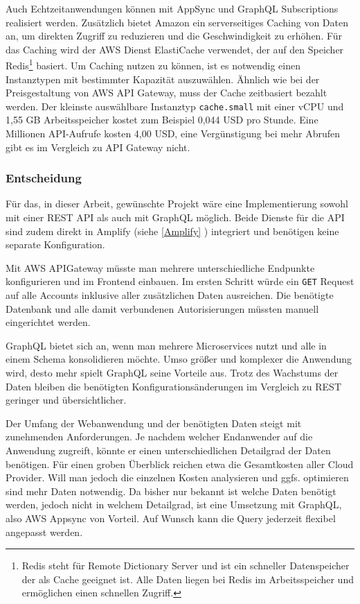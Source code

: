 Auch Echtzeitanwendungen können mit AppSync und GraphQL Subscriptions realisiert werden.
Zusätzlich bietet Amazon ein serverseitiges Caching von Daten an, um direkten Zugriff zu reduzieren und die Geschwindigkeit zu erhöhen.
Für das Caching wird der AWS Dienst ElastiCache verwendet, der auf den Speicher Redis\footnote{Redis steht für Remote Dictionary Server und ist ein schneller Datenspeicher der als Cache geeignet ist. Alle Daten liegen bei Redis im Arbeitsspeicher und ermöglichen einen schnellen Zugriff.} basiert.
Um Caching nutzen zu können, ist es notwendig einen Instanztypen mit bestimmter Kapazität auszuwählen.
Ähnlich wie bei der Preisgestaltung von AWS API Gateway, muss der Cache zeitbasiert bezahlt werden.
Der kleinste auswählbare Instanztyp \verb+cache.small+ mit einer vCPU und 1,55 GB Arbeitsspeicher kostet zum Beispiel 0,044 USD pro Stunde.
Eine Millionen API-Aufrufe kosten 4,00 USD, eine Vergünstigung bei mehr Abrufen gibt es im Vergleich zu API Gateway nicht.
\cite[]{AppSync} \cite[]{AppSyncPreise}



\subsubsection{Entscheidung}
Für das, in dieser Arbeit, gewünschte Projekt wäre eine Implementierung sowohl mit einer REST API als auch mit GraphQL möglich.
Beide Dienste für die API sind zudem direkt in Amplify (siehe \ref{Amplify} ) integriert und benötigen keine separate Konfiguration.

Mit AWS APIGateway müsste man mehrere unterschiedliche Endpunkte konfigurieren und im Frontend einbauen.
Im ersten Schritt würde ein \verb+GET+ Request auf alle Accounts inklusive aller zusätzlichen Daten ausreichen.
Die benötigte Datenbank und alle damit verbundenen Autorisierungen müssten manuell eingerichtet werden.

GraphQL bietet sich an, wenn man mehrere Microservices nutzt und alle in einem Schema konsolidieren möchte.
Umso größer und komplexer die Anwendung wird, desto mehr spielt GraphQL seine Vorteile aus.
Trotz des Wachstums der Daten bleiben die benötigten Konfigurationsänderungen im Vergleich zu REST geringer und übersichtlicher.

Der Umfang der Webanwendung und der benötigten Daten steigt mit zunehmenden Anforderungen.
Je nachdem welcher Endanwender auf die Anwendung zugreift, könnte er einen unterschiedlichen Detailgrad der Daten benötigen.
Für einen groben Überblick reichen etwa die Gesamtkosten aller Cloud Provider.
Will man jedoch die einzelnen Kosten analysieren und ggfs. optimieren sind mehr Daten notwendig.
Da bisher nur bekannt ist welche Daten benötigt werden, jedoch nicht in welchem Detailgrad, ist eine Umsetzung mit GraphQL, also AWS Appsync von Vorteil.
Auf Wunsch kann die Query jederzeit flexibel angepasst werden.


